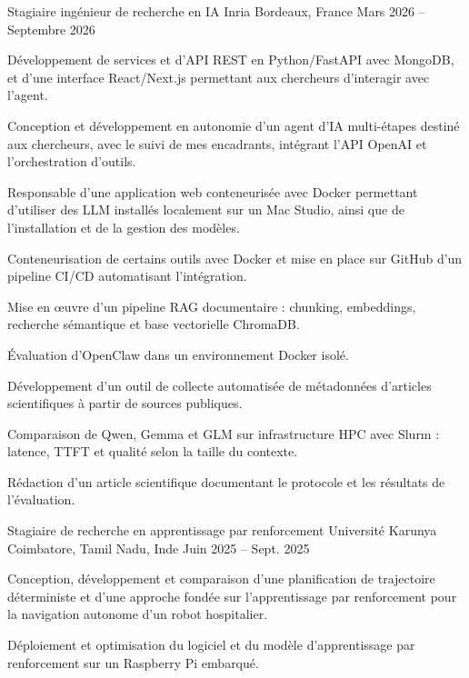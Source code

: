 
\begin{cventries}
  \cventry
    {Stagiaire ingénieur de recherche en IA}
    {Inria}
    {Bordeaux, France}
    {Mars 2026 -- Septembre 2026}
    {
      \begin{cvitems}
        \item {Développement de services et d’API REST en Python/FastAPI avec MongoDB, et d’une interface React/Next.js permettant aux chercheurs d’interagir avec l’agent.}
        \item {Conception et développement en autonomie d’un agent d’IA multi-étapes destiné aux chercheurs, avec le suivi de mes encadrants, intégrant l’API OpenAI et l’orchestration d’outils.}
        \item {Responsable d’une application web conteneurisée avec Docker permettant d’utiliser des LLM installés localement sur un Mac Studio, ainsi que de l’installation et de la gestion des modèles.}
        \item {Conteneurisation de certains outils avec Docker et mise en place sur GitHub d’un pipeline CI/CD automatisant l’intégration.}
        \item {Mise en œuvre d’un pipeline RAG documentaire : chunking, embeddings, recherche sémantique et base vectorielle ChromaDB.}
        \item {Évaluation d’OpenClaw dans un environnement Docker isolé.}
        \item {Développement d’un outil de collecte automatisée de métadonnées d’articles scientifiques à partir de sources publiques.}
        \item {Comparaison de Qwen, Gemma et GLM sur infrastructure HPC avec Slurm : latence, TTFT et qualité selon la taille du contexte.}
        \item {Rédaction d’un article scientifique documentant le protocole et les résultats de l’évaluation.}
      \end{cvitems}
    }

  \cventry
    {Stagiaire de recherche en apprentissage par renforcement}
    {Université Karunya}
    {Coimbatore, Tamil Nadu, Inde}
    {Juin 2025 -- Sept. 2025}
    {
      \begin{cvitems}
        \item {Conception, développement et comparaison d’une planification de trajectoire déterministe et d’une approche fondée sur l’apprentissage par renforcement pour la navigation autonome d’un robot hospitalier.}
        \item {Déploiement et optimisation du logiciel et du modèle d’apprentissage par renforcement sur un Raspberry Pi embarqué.}
      \end{cvitems}
    }
\end{cventries}
